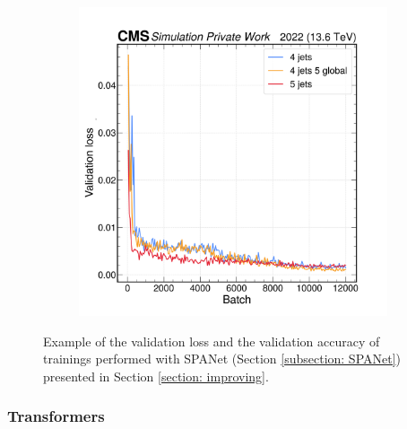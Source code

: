 \begin{figure}[h!]
\begin{subfigure}[b]{0.45\textwidth}
        \includegraphics[width=\textwidth]{Images/5.SPANet/validation_loss.png}
    \end{subfigure}
    \caption{Example of the validation loss and the validation accuracy of trainings performed with SPANet (Section \ref{subsection: SPANet}) presented in Section \ref{section: improving}.}
    \label{fig: validation}
\end{figure}

\subsubsection{Transformers} \label{subsection: Attention based transformers}

